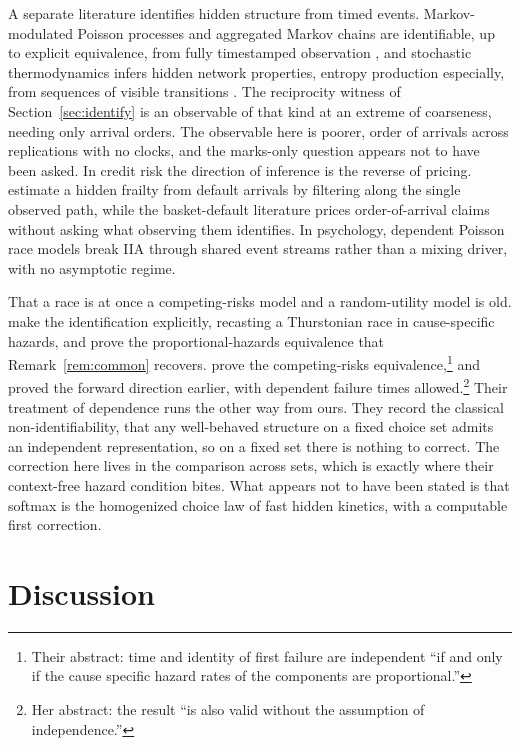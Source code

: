\documentclass[11pt]{article}
\theoremstyle{remark}
\begin{document}
A separate literature identifies hidden structure from timed events.
Markov-modulated Poisson processes and aggregated Markov chains are
identifiable, up to explicit equivalence, from fully timestamped observation
\citep{ryden1996,fredkin1986}, and stochastic thermodynamics infers hidden
network properties, entropy production especially, from sequences of visible
transitions \citep{skinner2021,harunari2022}. The reciprocity witness of
Section~\ref{sec:identify} is an observable of that kind at an extreme of
coarseness, needing only arrival orders. The observable here is poorer, order of
arrivals across replications with no clocks, and the marks-only question
appears not to have been asked. In credit risk the direction of inference is
the reverse of pricing. \citet{duffie2009} estimate a hidden frailty from
default arrivals by filtering along the single observed path, while the
basket-default literature prices order-of-arrival claims without asking what
observing them identifies. In psychology, dependent Poisson race models
\citep{ruan2008} break IIA through shared event streams rather than a mixing
driver, with no asymptotic regime.

That a race is at once a competing-risks model and a random-utility model is
old. \citet{marley1992} make the identification explicitly, recasting a
Thurstonian race in cause-specific hazards, and prove the proportional-hazards equivalence that
Remark~\ref{rem:common} recovers. \citet{kochar1991} prove the
competing-risks equivalence,\footnote{Their abstract: time and identity of
first failure are independent ``if and only if the cause specific hazard rates
of the components are proportional.''} and \citet{elandt1976} proved the
forward direction earlier, with dependent failure times
allowed.\footnote{Her abstract: the result ``is also valid without the
assumption of independence.''} Their treatment of dependence
runs the other way from ours. They record the classical non-identifiability,
that any well-behaved structure on a fixed choice set admits an independent
representation, so on a fixed set there is nothing to correct. The correction
here lives in the comparison across sets, which is exactly where their
context-free hazard condition bites. What
appears not to have been stated is that softmax is the homogenized choice law of
fast hidden kinetics, with a computable first correction.

\section{Discussion}
\end{document}
